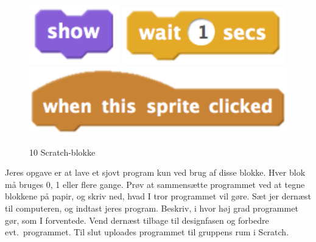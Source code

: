 \begin{figure}
  \includegraphics[height=0.04\paperheight]{figures/show.png}
  \includegraphics[height=0.04\paperheight]{figures/wait.png}
  \includegraphics[height=0.055\paperheight]{figures/when.png}
  \caption{10 Scratch-blokke}
  \label{fig:blokke}
\end{figure}
Jeres opgave er at lave et sjovt program kun ved brug af disse blokke. Hver blok må bruges 0, 1 eller flere gange. Prøv at sammensætte programmet ved at tegne blokkene på papir, og skriv ned, hvad I tror programmet vil gøre. Sæt jer dernæst til computeren, og indtast jeres program. Beskriv, i hvor høj grad programmet gør, som I forventede. Vend dernæst tilbage til designfasen og forbedre evt.\ programmet. Til slut uploades programmet til gruppens rum i Scratch.
